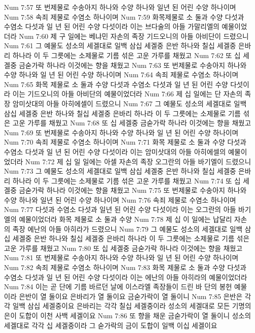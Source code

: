 Num 7:57  또 번제물로 수송아지 하나와 수양 하나와 일년 된 어린 수양 하나이며
Num 7:58  속죄 제물로 수염소 하나이며
Num 7:59  화목제물로 소 둘과 수양 다섯과 수염소 다섯과 일 년 된 어린 수양 다섯이라 이는 브다술의 아들 가말리엘의 예물이었더라
Num 7:60  제 구 일에는 베냐민 자손의 족장 기드오니의 아들 아비단이 드렸으니
Num 7:61  그 예물도 성소의 세겔대로 일백 삼십 세겔중 은반 하나와 칠십 세겔중 은바리 하나라 이 두 그릇에는 소제물로 기름 섞은 고운 가루를 채웠고
Num 7:62  또 십 세겔중 금숟가락 하나라 이것에는 향을 채웠고
Num 7:63  또 번제물로 수송아지 하나와 수양 하나와 일 년 된 어린 수양 하나이며
Num 7:64  속죄 제물로 수염소 하나이며
Num 7:65  화목 제물로 소 둘과 수양 다섯과 수염소 다섯과 일 년 된 어린 수양 다섯이라 이는 기드오니의 아들 아비단의 예물이었더라
Num 7:66  제 십 일에는 단 자손의 족장 암미삿대의 아들 아히에셀이 드렸으니
Num 7:67  그 예물도 성소의 세겔대로 일백 삼십 세겔중 은반 하나와 칠십 세겔중 은바리 하나라 이 두 그릇에는 소제물로 기름 섞은 고운 가루를 채웠고
Num 7:68  또 십 세겔중 금숟가락 하나라 이것에는 향을 채웠고
Num 7:69  또 번제물로 수송아지 하나와 수양 하나와 일 년 된 어린 수양 하나이며
Num 7:70  속죄 제물로 수염소 하나이며
Num 7:71  화목 제물로 소 둘과 수양 다섯과 수염소 다섯과 일 년 된 어린 수양 다섯이라 이는 암미삿대의 아들 아히에셀의 예물이었더라
Num 7:72  제 십 일 일에는 아셀 자손의 족장 오그란의 아들 바기엘이 드렸으니
Num 7:73  그 예물도 성소의 세겔대로 일백 삼십 세겔중 은반 하나와 칠십 세겔중 은바리 하나라 이 두 그릇에는 소제물로 기름 섞은 고운 가루를 채웠고
Num 7:74  또 십 세겔중 금숟가락 하나라 이것에는 향을 채웠고
Num 7:75  또 번제물로 수송아지 하나와 수양 하나와 일년 된 어린 수양 하나이며
Num 7:76  속죄 제물로 수염소 하나이며
Num 7:77  다섯과 수염소 다섯과 일년 된 어린 수양 다섯이라 이는 오그란의 아들 바기엘의 예물이었더라 화목 제물로 소 둘과 수양
Num 7:78  제 십 이 일에는 납달리 자손의 족장 에난의 아들 아히라가 드렸으니
Num 7:79  그 예물도 성소의 세겔대로 일백 삼십 세겔중 은반 하나와 칠십 세겔중 은바리 하나라 이 두 그릇에는 소제물로 기름 섞은 고운 가루를 채웠고
Num 7:80  또 십 세겔중 금숟가락 하나라 이것에는 향을 채웠고
Num 7:81  또 번제물로 수송아지 하나와 수양 하나와 일 년 된 어린 수양 하나이며
Num 7:82  속죄 제물로 수염소 하나이며
Num 7:83  화목 제물로 소 둘과 수양 다섯과 수염소 다섯과 일 년 된 어린 수양 다섯이라 이는 에난의 아들 아히라의 예물이었더라
Num 7:84  이는 곧 단에 기름 바르던 날에 이스라엘 족장들이 드린 바 단의 봉헌 예물이라 은반이 열 둘이요 은바리가 열 둘이요 금숟가락이 열 둘이니
Num 7:85  은반은 각각 일백 삼십 세겔중이요 은바리는 각각 칠십 세겔중이라 성소의 세겔대로 모든 기명의 은이 도합이 이천 사백 세겔이요
Num 7:86  또 향을 채운 금숟가락이 열 둘이니 성소의 세겔대로 각각 십 세겔중이라 그 숟가락의 금이 도합이 일백 이십 세겔이요
